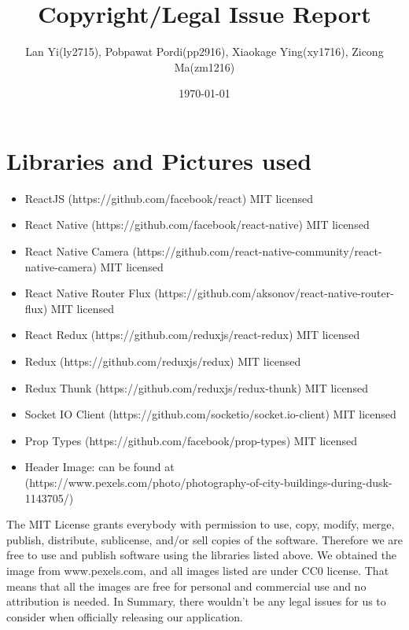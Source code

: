 \documentclass[a4wide, 11pt]{article}
\begin{document}
\title{Copyright/Legal Issue Report}

\author{Lan Yi(ly2715), Pobpawat Pordi(pp2916), Xiaokage Ying(xy1716), Zicong Ma(zm1216)}

\date{\today}         %

\maketitle            %

\section{Libraries and Pictures used}
\begin{itemize}

    \item ReactJS (https://github.com/facebook/react) MIT licensed
    \item React Native (https://github.com/facebook/react-native) MIT licensed 
    \item React Native Camera (https://github.com/react-native-community/react-native-camera) MIT licensed 
    \item React Native Router Flux (https://github.com/aksonov/react-native-router-flux) MIT licensed  
    \item React Redux (https://github.com/reduxjs/react-redux) MIT licensed 
    \item Redux (https://github.com/reduxjs/redux) MIT licensed 
    \item Redux Thunk (https://github.com/reduxjs/redux-thunk) MIT licensed 
    \item Socket IO Client (https://github.com/socketio/socket.io-client) MIT licensed
    \item Prop Types (https://github.com/facebook/prop-types) MIT licensed
    \item Header Image: can be found at (https://www.pexels.com/photo/photography-of-city-buildings-during-dusk-1143705/)
    
\end{itemize}

The MIT License grants everybody with permission to use, copy, modify, merge, publish, distribute, sublicense, and/or sell copies of the software. Therefore we are free to use and publish software using the libraries listed above. We obtained the image from www.pexels.com, and all images listed are under CC0 license. That means that all the images are free for personal and commercial use and no attribution is needed.
In Summary, there wouldn't be any legal issues for us to consider when officially releasing our application.
\end{document}
